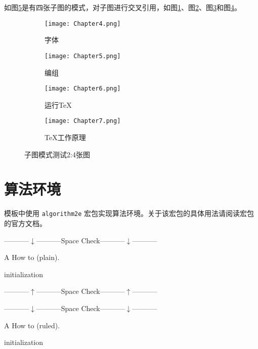 如图\ref{fig:subfig_test2}是有四张子图的模式，对子图进行交叉引用，如图\ref{subfig:2a}、图\ref{subfig:2b}、图\ref{subfig:2c}和图\ref{subfig:2d}。

\begin{figure}[htbp]
	\centering
	\begin{subfigure}[b]{.4\textwidth}
		\centering
		\texttt{[image: Chapter4.png]}
		\caption{字体}\label{subfig:2a}
	\end{subfigure}
	\begin{subfigure}[b]{.4\textwidth}
		\centering
		\texttt{[image: Chapter5.png]}
		\caption{编组}\label{subfig:2b}
	\end{subfigure}
	\begin{subfigure}[b]{.4\textwidth}
		\centering
		\texttt{[image: Chapter6.png]}
		\caption{运行\TeX}\label{subfig:2c}
	\end{subfigure}
	\begin{subfigure}[b]{.4\textwidth}
		\centering
		\texttt{[image: Chapter7.png]}
		\caption{\TeX 工作原理}\label{subfig:2d}
	\end{subfigure}
	\caption{子图模式测试2:4张图}\label{fig:subfig_test2}
\end{figure}

\section{算法环境}

模板中使用 \texttt{algorithm2e} 宏包实现算法环境。关于该宏包的具体用法请阅读宏包的官方文档。\\
\centerline{-----------$\downarrow$-----------Space Check-----------$\downarrow$-----------}
\begin{algorithm}[!h]
  \caption{A How to (plain).}
  
  initialization\;
\end{algorithm}

\centerline{-----------$\uparrow$-----------Space Check-----------$\uparrow$-----------}

\centerline{-----------$\downarrow$-----------Space Check-----------$\downarrow$-----------}
\begin{algorithm}[!h]
  \caption{A How to (ruled).}
  
  initialization\;
\end{algorithm}

